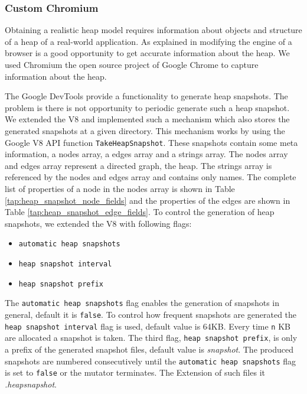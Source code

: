 
\subsubsection{Custom Chromium} \label{sec:custom_chromium}
Obtaining a realistic \JS heap model requires information about objects and structure of a heap of a real-world \JS application. As explained in \cite{JSMeter2009} modifying the \JS engine of a browser is a good opportunity to get accurate information about the \JS heap. We used Chromium \cite{Chromium} the open source project of Google Chrome \cite{Chrome} to capture information about the \JS heap.

The Google DevTools \cite{DevTools} provide a functionality to generate heap snapshots. The problem is there is not opportunity to periodic generate such a heap snapshot. We extended the V8 and implemented such a mechanism which also stores the generated snapshots at a given directory. This mechanism works by using the Google V8 API function \texttt{TakeHeapSnapshot}. These snapshots contain some meta information, a nodes array, a edges array and a strings array. The nodes array and edges array represent a directed graph, the heap. The strings array is referenced by the nodes and edges array and contains only names. The complete list of properties of a node in the nodes array is shown in Table \ref{tap:heap_snapshot_node_fields} and the properties of the edges are shown in Table \ref{tap:heap_snapshot_edge_fields}. To control the generation of heap snapshots, we extended the V8 with following flags:
\begin{itemize}
	\item \texttt{automatic heap snapshots}
	\item \texttt{heap snapshot interval}
	\item \texttt{heap snapshot prefix} 
\end{itemize}	
The \texttt{automatic heap snapshots} flag enables the generation of snapshots in general, default it is \texttt{false}. To control how frequent snapshots are generated the \texttt{heap snapshot interval} flag is used, default value is 64KB. Every time \texttt{n} KB are allocated a snapshot is taken. The third flag, \texttt{heap snapshot prefix}, is only a prefix of the generated snapshot files, default value is \textit{snapshot}. The produced snapshots are numbered consecutively until the \texttt{automatic heap snapshots} flag is set to \texttt{false} or the mutator terminates. The Extension of such files it \textit{.heapsnapshot}. 

